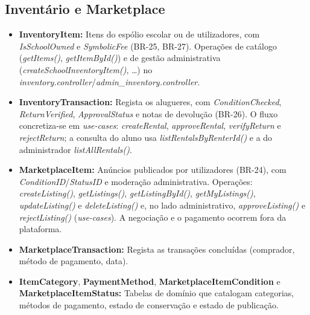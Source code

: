 \documentclass[12pt,a4paper]{report}
\begin{document}
\subsection{Inventário e Marketplace}
\begin{itemize}
    \item \textbf{InventoryItem:} Itens do espólio escolar ou de utilizadores, com
    \textit{IsSchoolOwned} e \textit{SymbolicFee} (BR-25, BR-27). Operações de
    catálogo (\textit{getItems()}, \textit{getItemById()}) e de gestão
    administrativa (\textit{createSchoolInventoryItem()}, \ldots) no
    \textit{inventory.controller}/\textit{admin\_inventory.controller}.

    \item \textbf{InventoryTransaction:} Regista os alugueres, com
    \textit{ConditionChecked}, \textit{ReturnVerified}, \textit{ApprovalStatus} e
    notas de devolução (BR-26). O fluxo concretiza-se em \textit{use-cases}:
    \textit{createRental}, \textit{approveRental}, \textit{verifyReturn} e
    \textit{rejectReturn}; a consulta do aluno usa
    \textit{listRentalsByRenterId()} e a do administrador \textit{listAllRentals()}.

    \item \textbf{MarketplaceItem:} Anúncios publicados por utilizadores (BR-24),
    com \textit{ConditionID}/\textit{StatusID} e moderação administrativa.
    Operações: \textit{createListing()}, \textit{getListings()},
    \textit{getListingById()}, \textit{getMyListings()}, \textit{updateListing()} e
    \textit{deleteListing()} e, no lado administrativo, \textit{approveListing()} e
    \textit{rejectListing()} (\textit{use-cases}). A negociação e o pagamento
    ocorrem fora da plataforma.

    \item \textbf{MarketplaceTransaction:} Regista as transações concluídas
    (comprador, método de pagamento, data).

    \item \textbf{ItemCategory}, \textbf{PaymentMethod},
    \textbf{MarketplaceItemCondition} e \textbf{MarketplaceItemStatus:} Tabelas de
    domínio que catalogam categorias, métodos de pagamento, estado de conservação e
    estado de publicação.
\end{itemize}
\end{document}
